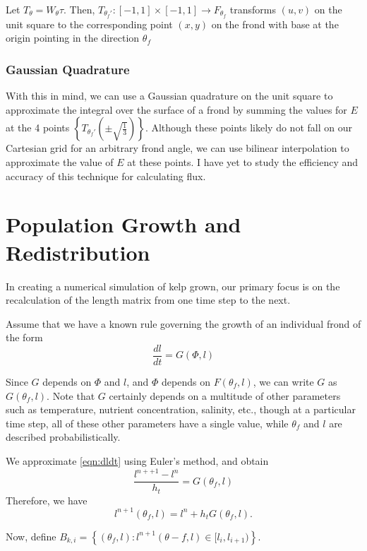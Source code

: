 \documentclass[10pt]{article}
\begin{document}
\begin{multicols}{2}
Let $T_{\theta} = W_{\theta} \tau$.
Then, $T_{\theta_f'}: [-1,1]\times[-1,1] \to F_{\theta_f}$ transforms $(u,v)$ on the unit square to the corresponding point $(x,y)$ on the frond with base at the origin pointing in the direction $\theta_f$

\subsubsection{Gaussian Quadrature}
With this in mind, we can use a Gaussian quadrature on the unit square to approximate the integral over the surface of a frond by summing the values for $E$ at the 4 points $\displaystyle\left\{T_{\theta_f'}\left(\pm\sqrt{\frac{1}{3}}\right)\right\}$. Although these points likely do not fall on our Cartesian grid for an arbitrary frond angle, we can use bilinear interpolation to approximate the value of $E$ at these points.
I have yet to study the efficiency and accuracy of this technique for calculating flux.
\section{Population Growth and Redistribution}
In creating a numerical simulation of kelp grown, our primary focus is on the recalculation of the length matrix from one time step to the next.

Assume that we have a known rule governing the growth of an individual frond of the form
\begin{equation}
	\frac{dl}{dt} = G(\Phi,l)
	\label{eqn:dldt}
\end{equation}

Since $G$ depends on $\Phi$ and $l$, and $\Phi$ depends on $F(\theta_f,l)$, we can write $G$ as  $G(\theta_f,l)$. Note that $G$ certainly depends on a multitude of other parameters such as temperature, nutrient concentration, salinity, etc., though at a particular time step, all of these other parameters have a single value, while $\theta_f$ and $l$ are described probabilistically.

We approximate \eqref{eqn:dldt} using Euler's method, and obtain
\begin{equation}
	\frac{l^{n++1} - l^n}{h_t} = G(\theta_f,l)
\end{equation}
Therefore, we have 
\begin{equation}
	l^{n+1}(\theta_f,l) = l^n + h_t G(\theta_f,l).
\end{equation}

Now, define $B_{k,i} = \left\{(\theta_f,l): l^{n+1}(\theta-f,l) \in [l_i,l_{i+1}) \right\}$.


\end{multicols}
\end{document}
